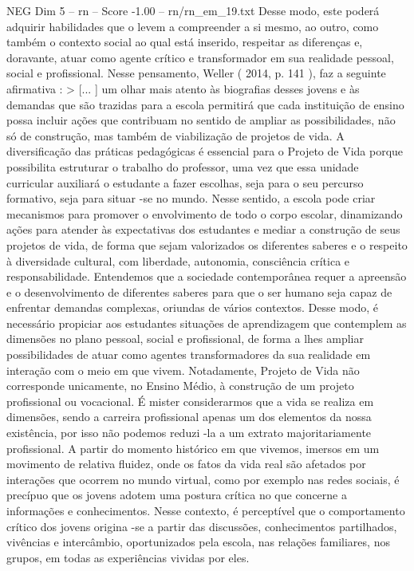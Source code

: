 \begin{textsample}{NEG Dim 5 – rn – Score -1.00 – rn/rn\_em\_19.txt}
Desse modo, este poderá adquirir habilidades que o levem a compreender a si mesmo, ao outro, como também o contexto social ao qual está inserido, respeitar as diferenças e, doravante, atuar como agente crítico e transformador em sua realidade pessoal, social e profissional.
Nesse pensamento, Weller ( 2014, p. 141 ), faz a seguinte afirmativa : > [... ] um olhar mais atento às biografias desses jovens e às demandas que são trazidas para a escola permitirá que cada instituição de ensino possa incluir ações que contribuam no sentido de ampliar as possibilidades, não só de construção, mas também de viabilização de projetos de vida.
A diversificação das práticas pedagógicas é essencial para o Projeto de Vida porque possibilita estruturar o trabalho do professor, uma vez que essa unidade curricular auxiliará o estudante a fazer escolhas, seja para o seu percurso formativo, seja para situar -se no mundo.
Nesse sentido, a escola pode criar mecanismos para promover o envolvimento de todo o corpo escolar, dinamizando ações para atender às expectativas dos estudantes e mediar a construção de seus projetos de vida, de forma que sejam valorizados os diferentes saberes e o respeito à diversidade cultural, com liberdade, autonomia, consciência crítica e responsabilidade.
Entendemos que a sociedade contemporânea requer a apreensão e o desenvolvimento de diferentes saberes para que o ser humano seja capaz de enfrentar demandas complexas, oriundas de vários contextos.
Desse modo, é necessário propiciar aos estudantes situações de aprendizagem que contemplem as dimensões no plano pessoal, social e profissional, de forma a lhes ampliar possibilidades de atuar como agentes transformadores da sua realidade em interação com o meio em que vivem.
Notadamente, Projeto de Vida não corresponde unicamente, no Ensino Médio, à construção de um projeto profissional ou vocacional.
É mister considerarmos que a vida se realiza em dimensões, sendo a carreira profissional apenas um dos elementos da nossa existência, por isso não podemos reduzi -la a um extrato majoritariamente profissional.
A partir do momento histórico em que vivemos, imersos em um movimento de relativa fluidez, onde os fatos da vida real são afetados por interações que ocorrem no mundo virtual, como por exemplo nas redes sociais, é precípuo que os jovens adotem uma postura crítica no que concerne a informações e conhecimentos.
Nesse contexto, é perceptível que o comportamento crítico dos jovens origina -se a partir das discussões, conhecimentos partilhados, vivências e intercâmbio, oportunizados pela escola, nas relações familiares, nos grupos, em todas as experiências vividas por eles.

\end{textsample}
